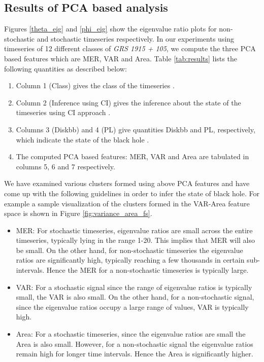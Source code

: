 \documentclass[10pt,conference]{IEEEtran}
\begin{document}
\subsection{Results of PCA based analysis}

Figures \ref{theta_eig}  and \ref{phi_eig} show the eigenvalue ratio plots for non-stochastic and stochastic timeseries respectively. In our experiments using timeseries of 12 different classes of \textit{GRS 1915 + 105}, we compute the three PCA based features which are MER, VAR and Area. Table \ref{tab:results} lists the following quantities as described below:

\begin{enumerate}
  \item Column 1 (Class) gives the class of the timeseries \cite{Adegoke2018}.
  \item Column 2 (Inference using CI) gives the inference about the state of the timeseries using CI approach \cite{Adegoke2018}.
  \item Columns 3 (Diskbb) and 4 (PL) give quantities Diskbb and  PL, respectively, which indicate the state of the black hole \cite{Adegoke2018}.
  \item The computed PCA based features: MER, VAR and Area  are tabulated in columns 5, 6 and 7 respectively.
\end{enumerate}

We have examined various clusters formed using above PCA features and have come up with the following guidelines in order to infer the state of black hole. For example a sample visualization of the clusters formed in the VAR-Area feature space is shown in Figure \ref{fig:variance_area_fs}.

\begin{itemize}
  \item MER: For stochastic timeseries, eigenvalue ratios  are small across the entire timeseries, typically lying in the range 1-20. This implies that MER  will also be small. On the other hand, for  non-stochastic timeseries the eigenvalue ratios are significantly high, typically reaching a few thousands in certain sub-intervals. Hence the MER for a non-stochastic timeseries is typically large.
  \item VAR: For a stochastic signal since the range of eigenvalue ratios is typically small, the VAR is also small. On the other hand, for a non-stochastic signal, since the eigenvalue ratios occupy a large range of values, VAR is typically high.
  \item Area: For a stochastic timeseries, since the eigenvalue ratios  are small the Area is also small. However, for a non-stochastic signal the eigenvalue ratios remain high for longer time intervals. Hence the Area is significantly higher.
\end{itemize}
\end{document}
